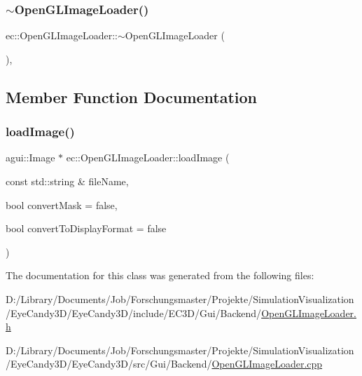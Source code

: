 \subsubsection{\texorpdfstring{$\sim$\+Open\+G\+L\+Image\+Loader()}{~OpenGLImageLoader()}}
{\footnotesize\ttfamily ec\+::\+Open\+G\+L\+Image\+Loader\+::$\sim$\+Open\+G\+L\+Image\+Loader (\begin{DoxyParamCaption}{ }\end{DoxyParamCaption})\hspace{0.3cm}{\ttfamily [virtual]}, {\ttfamily [default]}}



\subsection{Member Function Documentation}
\mbox{\label{classec_1_1_open_g_l_image_loader_a0e552f6d59a9fe5fd9208d7c664e67b7}} 
\subsubsection{\texorpdfstring{load\+Image()}{loadImage()}}
{\footnotesize\ttfamily agui\+::\+Image $\ast$ ec\+::\+Open\+G\+L\+Image\+Loader\+::load\+Image (\begin{DoxyParamCaption}\item[{const std\+::string \&}]{file\+Name,  }\item[{bool}]{convert\+Mask = {\ttfamily false},  }\item[{bool}]{convert\+To\+Display\+Format = {\ttfamily false} }\end{DoxyParamCaption})\hspace{0.3cm}{\ttfamily [override]}}



The documentation for this class was generated from the following files\+:\begin{DoxyCompactItemize}
\item 
D\+:/\+Library/\+Documents/\+Job/\+Forschungsmaster/\+Projekte/\+Simulation\+Visualization/\+Eye\+Candy3\+D/\+Eye\+Candy3\+D/include/\+E\+C3\+D/\+Gui/\+Backend/\mbox{\hyperlink{_open_g_l_image_loader_8h}{Open\+G\+L\+Image\+Loader.\+h}}\item 
D\+:/\+Library/\+Documents/\+Job/\+Forschungsmaster/\+Projekte/\+Simulation\+Visualization/\+Eye\+Candy3\+D/\+Eye\+Candy3\+D/src/\+Gui/\+Backend/\mbox{\hyperlink{_open_g_l_image_loader_8cpp}{Open\+G\+L\+Image\+Loader.\+cpp}}\end{DoxyCompactItemize}
